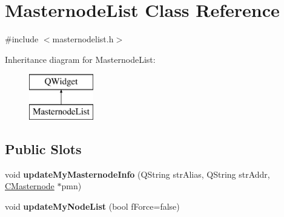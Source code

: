 \hypertarget{class_masternode_list}{}\section{Masternode\+List Class Reference}
\label{class_masternode_list}


{\ttfamily \#include $<$masternodelist.\+h$>$}

Inheritance diagram for Masternode\+List\+:\begin{figure}[H]
\begin{center}
\leavevmode
\includegraphics[height=2.000000cm]{class_masternode_list}
\end{center}
\end{figure}
\subsection*{Public Slots}
\begin{DoxyCompactItemize}
\item 
\mbox{\label{class_masternode_list_aab24be7fcf713ad32d557e163cbd3d8d}} 
void {\bfseries update\+My\+Masternode\+Info} (Q\+String str\+Alias, Q\+String str\+Addr, \mbox{\hyperlink{class_c_masternode}{C\+Masternode}} $\ast$pmn)
\item 
\mbox{\label{class_masternode_list_abfb8462c699669f75f7a8005089bdb0a}} 
void {\bfseries update\+My\+Node\+List} (bool f\+Force=false)
\end{DoxyCompactItemize}
